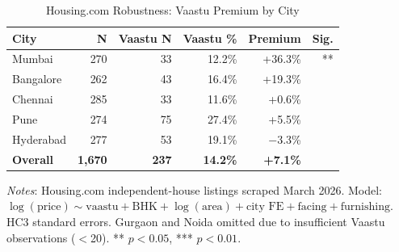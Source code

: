 \begin{table}[!htbp]
\centering
\caption{Housing.com Robustness: Vaastu Premium by City}
\label{tab:housingcom-robustness}
\begin{tabular}{lrrrrr}
\toprule
City & N & Vaastu N & Vaastu \% & Premium & Sig. \\
\midrule
Mumbai & 270 & 33 & 12.2\% & +36.3\% & ** \\
Bangalore & 262 & 43 & 16.4\% & +19.3\% &  \\
Chennai & 285 & 33 & 11.6\% & +0.6\% &  \\
Pune & 274 & 75 & 27.4\% & +5.5\% &  \\
Hyderabad & 277 & 53 & 19.1\% & $-$3.3\% &  \\
\midrule
\textbf{Overall} & \textbf{1,670} & \textbf{237} & \textbf{14.2\%} & \textbf{+7.1\%} &  \\
\bottomrule
\end{tabular}

\vspace{0.5em}
\parbox{\textwidth}{\small\textit{Notes}: Housing.com independent-house listings scraped March 2026. Model: $\log(\text{price}) \sim \text{vaastu} + \text{BHK} + \log(\text{area}) + \text{city FE} + \text{facing} + \text{furnishing}$. HC3 standard errors. Gurgaon and Noida omitted due to insufficient Vaastu observations ($<$20). ** $p<0.05$, *** $p<0.01$.}
\end{table}